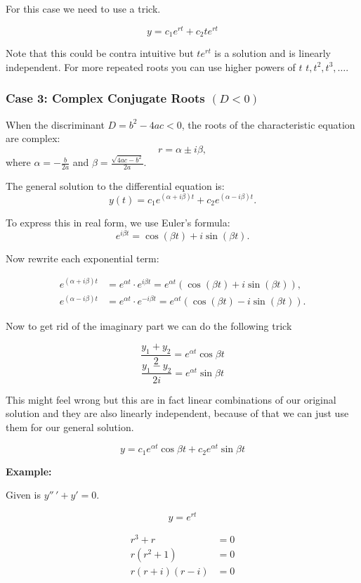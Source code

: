 For this case we need to use a trick.

\[y = c_1 e^{rt} + c_2 te^{rt}\]

Note that this could be contra intuitive but \(te^{rt}\) is a solution and is linearly independent.
For more repeated roots you can use higher powers of \(t\) \(t, t^2, t^3, \dots\).

\subsubsection{Case 3: Complex Conjugate Roots \texorpdfstring{\( (D < 0) \)}{}}

When the discriminant \( D = b^2 - 4ac < 0 \), the roots of the characteristic equation are complex:
\[
r = \alpha \pm i\beta,
\]
where \( \alpha = -\frac{b}{2a} \) and \( \beta = \frac{\sqrt{4ac - b^2}}{2a} \).

The general solution to the differential equation is:
\[
y(t) = c_1 e^{(\alpha + i\beta)t} + c_2 e^{(\alpha - i\beta)t}.
\]

To express this in real form, we use Euler’s formula:
\[
e^{i\beta t} = \cos(\beta t) + i\sin(\beta t).
\]

Now rewrite each exponential term:

\begin{align*}
e^{(\alpha + i\beta)t} &= e^{\alpha t} \cdot e^{i\beta t} = e^{\alpha t} (\cos(\beta t) + i \sin(\beta t)), \\
e^{(\alpha - i\beta)t} &= e^{\alpha t} \cdot e^{-i\beta t} = e^{\alpha t} (\cos(\beta t) - i \sin(\beta t)).
\end{align*}

Now to get rid of the imaginary part we can do the following trick

\[\frac{y_1 + y_2}{2} = e^{\alpha t}\cos\beta t\]
\[\frac{y_1 - y_2}{2i} = e^{\alpha t}\sin\beta t\]

This might feel wrong but this are in fact linear combinations of our original solution
and they are also linearly independent, because of that we can just use them for our general solution.

\[y = c_1 e^{\alpha t}\cos\beta t + c_2  e^{\alpha t}\sin\beta t\]

\textbf{Example:}
\vspace{\baselineskip}

Given is \(y''\,' + y' = 0\).

\[y = e^{rt}\]

\begin{align*}
r^3 + r &= 0\\
r(r^2 + 1) &= 0\\
r(r + i)(r - i) &= 0
\end{align*}


